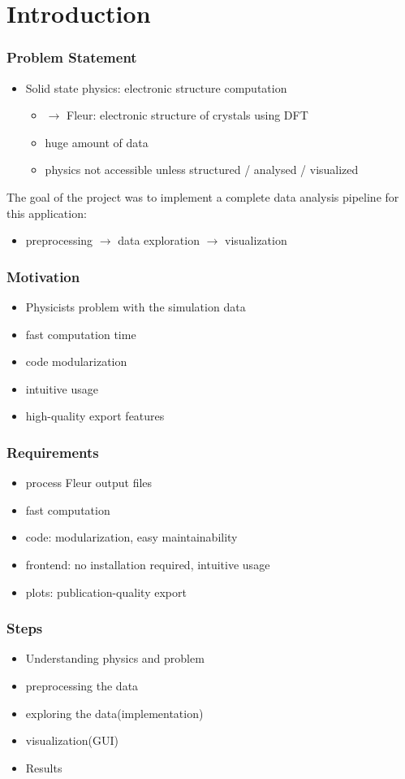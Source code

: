 \documentclass{beamer}
\begin{document}
\section{Introduction}
\label{sec:introduction}




\begin{frame}\frametitle{Problem Statement}
\begin{itemize}
\item Solid state physics: electronic structure computation
\begin{itemize}
\item \(\rightarrow\) Fleur: electronic structure of crystals using DFT
\item huge amount of data
\item physics not accessible unless structured / analysed / visualized
\end{itemize}
\end{itemize}
The goal of the project was to implement a complete data analysis pipeline for this application:
\begin{itemize}
\item preprocessing \(\rightarrow\) data exploration \(\rightarrow\) visualization
\end{itemize}
\end{frame}

\begin{frame}\frametitle{Motivation}
\begin{itemize}
\item Physicists problem with the simulation data
\item fast computation time
\item code modularization
\item intuitive usage
\item high-quality export features
\end{itemize}
\end{frame}

\begin{frame}\frametitle{Requirements}
\begin{itemize}
\item process Fleur output files
\item fast computation
\item code: modularization, easy maintainability
\item frontend: no installation required, intuitive usage
\item plots: publication-quality export
\end{itemize}
\end{frame}

\begin{frame}\frametitle{Steps}
\begin{itemize}
\item Understanding physics and problem
\item preprocessing the data
\item exploring the data(implementation)
\item visualization(GUI)
\item Results
\end{itemize}
\end{frame}
\end{document}
